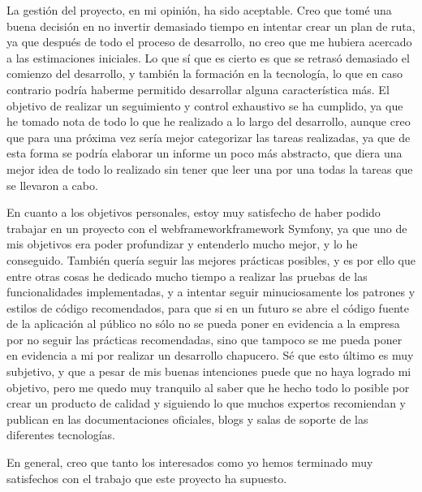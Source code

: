 La gestión del proyecto, en mi opinión, ha sido aceptable. Creo que tomé una buena
decisión en no invertir demasiado tiempo en intentar crear un plan de ruta, ya que
después de todo el proceso de desarrollo, no creo que me hubiera acercado a las
estimaciones iniciales. Lo que sí que es cierto es que se retrasó demasiado el
comienzo del desarrollo, y también la formación en la tecnología, lo que en caso
contrario podría haberme permitido desarrollar alguna característica más. El objetivo
de realizar un seguimiento y control exhaustivo se ha cumplido, ya que he tomado nota
de todo lo que he realizado a lo largo del desarrollo, aunque creo que para una
próxima vez sería mejor categorizar las tareas realizadas, ya que de esta forma
se podría elaborar un informe un poco más abstracto, que diera una mejor idea de
todo lo realizado sin tener que leer una por una todas la tareas que se llevaron a cabo.

En cuanto a los objetivos personales, estoy muy satisfecho de haber podido
trabajar en un proyecto con el \gls{webframework}{framework} Symfony, ya que uno
de mis objetivos era poder profundizar y entenderlo mucho mejor, y lo he conseguido.
También quería seguir las mejores prácticas posibles, y es por ello que entre otras
cosas he dedicado mucho tiempo a realizar las pruebas de las funcionalidades
implementadas, y a intentar seguir minuciosamente los patrones y estilos de código
recomendados, para que si en un futuro se abre el código fuente de la aplicación al público
no sólo no se pueda poner en evidencia a la empresa por no seguir las prácticas recomendadas,
sino que tampoco se me pueda poner en evidencia a mi por realizar un desarrollo chapucero. Sé
que esto último es muy subjetivo, y que a pesar de mis buenas intenciones puede que
no haya logrado mi objetivo, pero me quedo muy
tranquilo al saber que he hecho todo lo posible por crear un producto de calidad y
siguiendo lo que muchos expertos recomiendan y publican en las documentaciones
oficiales, blogs y salas de soporte de las diferentes tecnologías.

En general, creo que tanto los interesados como yo hemos terminado muy satisfechos
con el trabajo que este proyecto ha supuesto.
